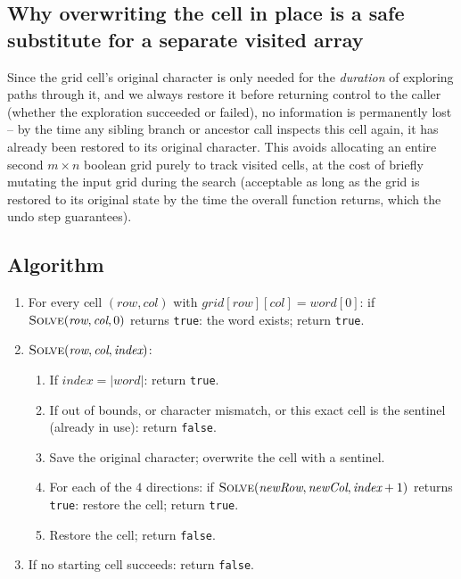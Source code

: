 \subsection*{Why overwriting the cell in place is a safe substitute for a separate visited array}

Since the grid cell's original character is only needed for the
\emph{duration} of exploring paths through it, and we always restore it
before returning control to the caller (whether the exploration
succeeded or failed), no information is permanently lost -- by the time
any sibling branch or ancestor call inspects this cell again, it has
already been restored to its original character. This avoids allocating
an entire second $m \times n$ boolean grid purely to track visited
cells, at the cost of briefly mutating the input grid during the search
(acceptable as long as the grid is restored to its original state by
the time the overall function returns, which the undo step guarantees).

\subsection*{Algorithm}

\begin{enumerate}
  \item For every cell $(\textit{row}, \textit{col})$ with
        $\textit{grid}[\textit{row}][\textit{col}] = \textit{word}[0]$:
        if $\textsc{Solve}(\textit{row}, \textit{col}, 0)$ returns
        \texttt{true}: the word exists; return \texttt{true}.
  \item $\textsc{Solve}(\textit{row}, \textit{col}, \textit{index})$:
  \begin{enumerate}
    \item If $\textit{index} = |\textit{word}|$: return \texttt{true}.
    \item If out of bounds, or character mismatch, or this exact cell
          is the sentinel (already in use): return \texttt{false}.
    \item Save the original character; overwrite the cell with a
          sentinel.
    \item For each of the $4$ directions: if
          $\textsc{Solve}(\textit{newRow}, \textit{newCol},
          \textit{index}+1)$ returns \texttt{true}: restore the cell;
          return \texttt{true}.
    \item Restore the cell; return \texttt{false}.
  \end{enumerate}
  \item If no starting cell succeeds: return \texttt{false}.
\end{enumerate}

